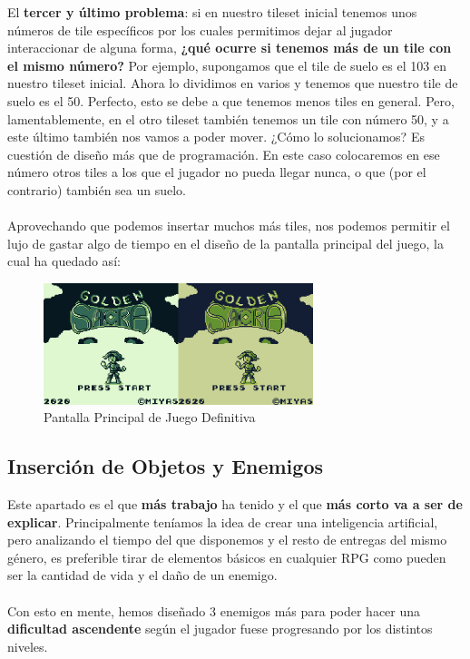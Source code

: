 El \textbf{tercer y último problema}: si en nuestro tileset inicial tenemos unos números de tile específicos por los cuales permitimos dejar al jugador interaccionar de alguna forma,\textbf{ ¿qué ocurre si tenemos más de un tile con el mismo número?} Por ejemplo, supongamos que el tile de suelo es el 103 en nuestro tileset inicial. Ahora lo dividimos en varios y tenemos que nuestro tile de suelo es el 50. Perfecto, esto se debe a que tenemos menos tiles en general. Pero, lamentablemente, en el otro tileset también tenemos un tile con número 50, y a este último también nos vamos a poder mover. ¿Cómo lo solucionamos? Es cuestión de diseño más que de programación. En este caso colocaremos en ese número otros tiles a los que el jugador no pueda llegar nunca, o que (por el contrario) también sea un suelo.
\\ \\
Aprovechando que podemos insertar muchos más tiles, nos podemos permitir el lujo de gastar algo de tiempo en el diseño de la pantalla principal del juego, la cual ha quedado así:

\begin{figure}[h]
\centering
\includegraphics[width=0.7\textwidth]{include/images/desarrollo/title_screen.png}
\caption{Pantalla Principal de Juego Definitiva}
\label{figure:titlescreen}
\end{figure}

\subsection{Inserción de Objetos y Enemigos}

Este apartado es el que \textbf{más trabajo} ha tenido y el que \textbf{más corto va a ser de explicar}. Principalmente teníamos la idea de crear una inteligencia artificial, pero analizando el tiempo del que disponemos y el resto de entregas del mismo género, es preferible tirar de elementos básicos en cualquier RPG como pueden ser la cantidad de vida y el daño de un enemigo.
\\ \\
Con esto en mente,  hemos diseñado 3 enemigos más para poder hacer una \textbf{dificultad ascendente} según el jugador fuese progresando por los distintos niveles.


